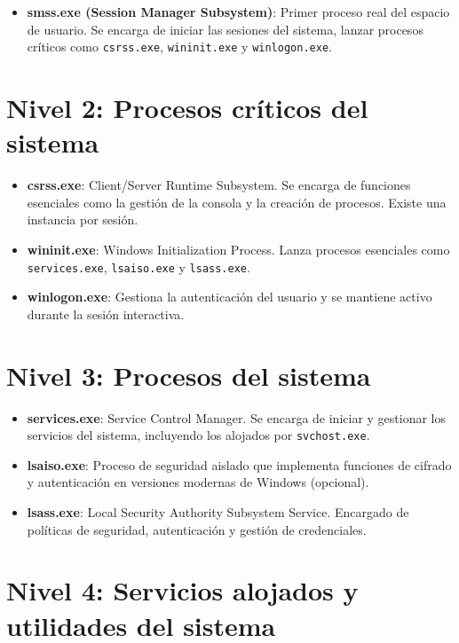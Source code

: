 \begin{itemize}
    \item \textbf{smss.exe (Session Manager Subsystem)}: Primer proceso real del
    espacio de usuario. Se encarga de iniciar las sesiones del sistema, lanzar
    procesos críticos como \texttt{csrss.exe}, \texttt{wininit.exe} y
    \texttt{winlogon.exe}.
\end{itemize}

\section*{Nivel 2: Procesos críticos del sistema}

\begin{itemize}
    \item \textbf{csrss.exe}: Client/Server Runtime Subsystem. Se encarga de
    funciones esenciales como la gestión de la consola y la creación de
    procesos. Existe una instancia por sesión.
    \item \textbf{wininit.exe}: Windows Initialization Process. Lanza procesos
    esenciales como \texttt{services.exe}, \texttt{lsaiso.exe} y
    \texttt{lsass.exe}.
    \item \textbf{winlogon.exe}: Gestiona la autenticación del usuario y se
    mantiene activo durante la sesión interactiva.
\end{itemize}

\section*{Nivel 3: Procesos del sistema}

\begin{itemize}
    \item \textbf{services.exe}: Service Control Manager. Se encarga de iniciar
    y gestionar los servicios del sistema, incluyendo los alojados por
    \texttt{svchost.exe}.
    \item \textbf{lsaiso.exe}: Proceso de seguridad aislado que implementa
    funciones de cifrado y autenticación en versiones modernas de Windows
    (opcional).
    \item \textbf{lsass.exe}: Local Security Authority Subsystem Service.
    Encargado de políticas de seguridad, autenticación y gestión de
    credenciales.
\end{itemize}

\section*{Nivel 4: Servicios alojados y utilidades del sistema}

